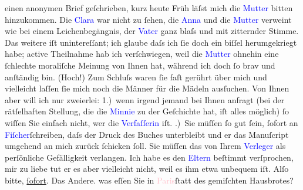                     einen anonymen Brief geſchrieben, kurz heute Früh läſst mich die \textcolor{blue}{Mutter}{} bitten hinzukommen.
                    Die \textcolor{blue}{Clara}{}\ledrightnote{\textcolor{blue}{Clara Katharina Pollaczek}} war nicht zu ſehen, die \textcolor{blue}{Anna}{}\ledrightnote{\textcolor{blue}{Anna Epstein}} und die \textcolor{blue}{Mutter}{} verweint wie bei einem Leichenbegängnis, der
                        \textcolor{blue}{Vater}{} ganz blaſs und
                    mit zitternder Stimme. Das weitere iſt unintereſſant; ich glaube daſs ich ſie
                    doch ein biſſel herumgekriegt {\pb}habe;  active Theilnahme hab ich
                    verſchwiegen, weil die \textcolor{blue}{Mutter}{} ohnehin eine ſchlechte moraliſche Meinung von Ihnen hat,
                    während ich doch ſo brav und anſtändig bin. (Hoch!)\pend
           \pstart
           Zum Schluſs waren ſie faſt gerührt über mich und vielleicht laſſen ſie mich noch die Männer für die Mädeln ausſuchen.
                    Von Ihnen aber will ich nur zweierlei: 1.) wenn irgend jemand bei Ihnen anfragt
                    (bei der rätſelhaften Stellung, die {\pb}die \textcolor{blue}{Minnie}{}\ledrightnote{\textcolor{blue}{Marianne Benedict}} zu der Geſchichte hat, iſt alles möglich) ſo
                    wiſſen Sie einfach nicht, wer die \textcolor{blue}{Verfaſſerin}{} iſt.\pend
           .) Sie müſſen ſo gut ſein, ſofort an \textcolor{blue}{Fiſcher}{}\ledrightnote{\textcolor{blue}{Samuel Fischer}}{ }ſchreiben, daſs der Druck des Buches
                    unterbleibt und er das Manuſcript umgehend an mich zurück ſchicken ſoll. Sie
                    müſſen das von Ihrem \textcolor{blue}{Verleger}{} als perſönliche Gefälligkeit verlangen. Ich habe es den \textcolor{blue}{Eltern}{} beſtimmt
                    verſprochen, mir zu liebe tut er es aber vielleicht nicht, weil {\pb}es ihm etwa unbequem iſt.
                    Alſo bitte, \uline{ſofort}.\pend
           \pstart
           \centering{}Das Andere.\pend
           \pstart
           \noindent{}was eſſen Sie in \textcolor{pink}{Paris}{}\ledrightnote{\textcolor{pink}{Paris}}{ }ſtatt des gemiſchten Hausbrotes?\pend
